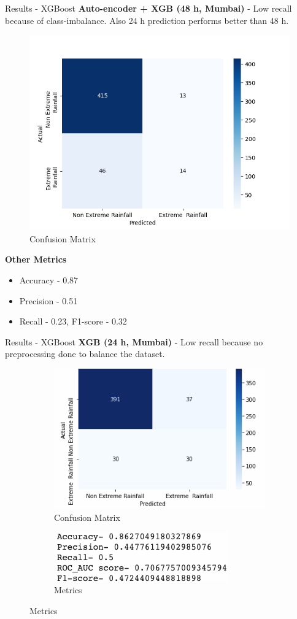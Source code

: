 \documentclass[11pt]{beamer}
\begin{document}
\begin{frame}{Results - XGBoost}
\textbf{Auto-encoder + XGB (48 h, Mumbai)} - Low recall because of class-imbalance. Also 24 h prediction performs better than 48 h.
\begin{figure}[!h]
\centering
\includegraphics[width=.4\linewidth]{mumbai.png}
\caption{Confusion Matrix}
\end{figure}

\textbf{\small Other Metrics} \begin{itemize}
\item Accuracy - 0.87
\item Precision - 0.51
\item Recall - 0.23, F1-score - 0.32
\end{itemize}
\end{frame}

\begin{frame}{Results - XGBoost} 
\textbf{XGB (24 h, Mumbai)} - Low recall because no preprocessing done to balance the dataset.
\begin{figure}[!h]
\begin{subfigure}{.5\textwidth}
\centering
\includegraphics[width=\linewidth]{xgb.png}
\caption{Confusion Matrix}
\end{subfigure}%
\begin{subfigure}{.5\textwidth}
\centering
\includegraphics[width=.8\linewidth]{xgb_metrics.png}
\caption{Metrics}
\end{subfigure}
\end{figure}
\end{frame}
\end{document}
